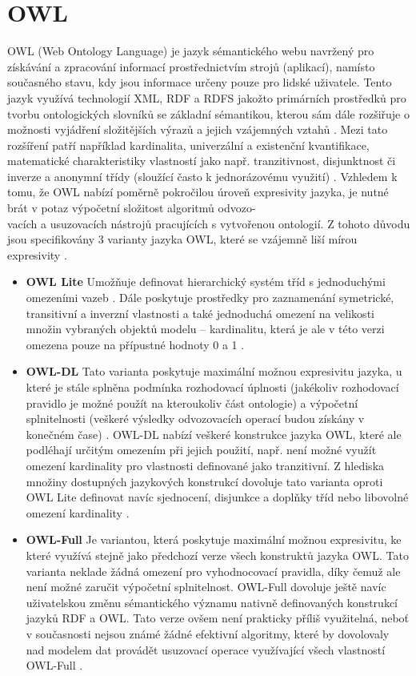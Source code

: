 \documentclass{projekt}
\begin{document}
\section{OWL}
\hspace{0.65cm}OWL (Web Ontology Language) je jazyk sémantického webu navržený pro získávání a zpracování informací prostřednictvím strojů (aplikací), namísto současného stavu, kdy jsou informace určeny pouze pro lidské uživatele. Tento jazyk využívá technologií XML, RDF a RDFS jakožto primárních prostředků pro tvorbu ontologických slovníků se základní sémantikou, kterou sám dále rozšiřuje o možnosti vyjádření složitějších výrazů a jejich vzájemných vztahů \cite{_35}. Mezi tato rozšíření patří například kardinalita, univerzální a existenční kvantifikace, matematické charakteristiky vlastností jako např. tranzitivnost, disjunktnost či inverze a anonymní třídy (sloužící  často k jednorázovému využití) \cite{_12}.
Vzhledem k tomu, že OWL nabízí poměrně pokročilou úroveň expresivity jazyka, je nutné brát v potaz výpočetní složitost algoritmů odvozo-\\vacích a usuzovacích nástrojů pracujících s vytvořenou ontologií. Z tohoto důvodu jsou specifikovány 3 varianty jazyka OWL, které se vzájemně liší mírou expresivity \cite{_2}.


\begin {itemize}

\item \textbf{OWL Lite} Umožňuje definovat hierarchický systém tříd s jednoduchými omezeními vazeb \cite{_11}. Dále poskytuje prostředky pro zaznamenání symetrické, transitivní a inverzní vlastnosti a také jednoduchá omezení na velikosti množin vybraných objektů modelu – kardinalitu, která je ale v této verzi omezena pouze na přípustné hodnoty 0 a 1 \cite{_2}.
\item \textbf{OWL-DL} Tato varianta poskytuje maximální možnou expresivitu jazyka, u které je stále splněna podmínka rozhodovací úplnosti (jakékoliv rozhodovací pravidlo je možné použít na kteroukoliv část ontologie) a výpočetní splnitelnosti (veškeré výsledky odvozovacích operací budou získány v konečném čase) \cite{_2}. OWL-DL nabízí veškeré konstrukce jazyka OWL, které ale podléhají určitým omezením při jejich použití, např. není možné využít omezení kardinality pro vlastnosti definované jako tranzitivní. Z hlediska množiny dostupných jazykových konstrukcí dovoluje tato varianta oproti OWL Lite definovat navíc sjednocení, disjunkce a doplňky tříd nebo libovolné omezení kardinality \cite{_11}.
\item \textbf{OWL-Full} Je variantou, která poskytuje maximální možnou expresivitu, ke které využívá stejně jako předchozí verze všech konstruktů jazyka OWL. Tato varianta neklade žádná omezení pro vyhodnocovací pravidla, díky čemuž ale není možné zaručit výpočetní splnitelnost. OWL-Full dovoluje ještě navíc uživatelskou změnu sémantického významu nativně definovaných konstrukcí jazyků RDF a OWL. Tato verze ovšem není prakticky příliš využitelná, neboť v současnosti nejsou známé žádné efektivní algoritmy, které by dovolovaly nad modelem dat provádět usuzovací operace využívající všech vlastností OWL-Full \cite{_2}.

\end {itemize}
\end{document}
